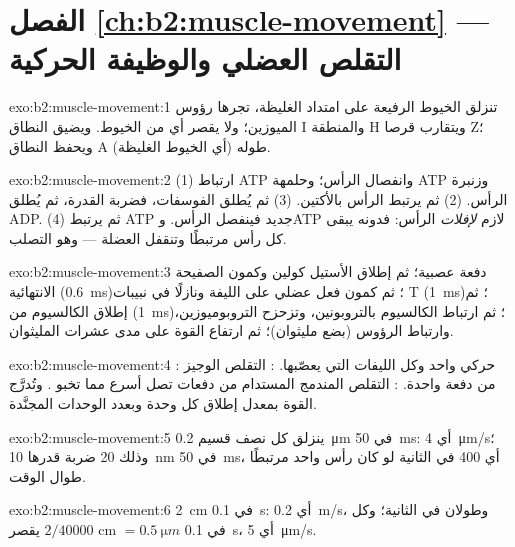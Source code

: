 \section*{الفصل \ref{ch:b2:muscle-movement} --- التقلص العضلي والوظيفة الحركية}

\begin{solution}{exo:b2:muscle-movement:1}
تنزلق الخيوط الرفيعة على امتداد الغليظة، تجرها رؤوس الميوزين؛
ولا يقصر أي من الخيوط. ويضيق النطاق I والمنطقة H ويتقارب
قرصا Z؛ ويحفظ النطاق A (أي الخيوط الغليظة) طوله.
\end{solution}

\begin{solution}{exo:b2:muscle-movement:2}
(1) ارتباط ATP وانفصال الرأس؛ وحلمهة ATP وزنبرة الرأس. (2) ثم يرتبط الرأس
بالأكتين. (3) ثم يُطلق الفوسفات، فضربة القدرة، ثم يُطلق ADP.
(4) ثم يرتبط ATP جديد فينفصل الرأس. وATP لازم
\emph{لإفلات} الرأس: فدونه يبقى كل رأس مرتبطًا وتنقفل
العضلة --- وهو التصلب.
\end{solution}

\begin{solution}{exo:b2:muscle-movement:3}
دفعة عصبية؛ ثم إطلاق الأستيل كولين وكمون الصفيحة الانتهائية
(\qty{0.6}{ms})؛ ثم كمون فعل عضلي على الليفة ونازلًا في
نبيبات T (\qty{1}{ms})؛ ثم إطلاق الكالسيوم من  (\qty{1}{ms})؛ ثم ارتباط الكالسيوم بالتروبونين، وتزحزح التروبوميوزين،
وارتباط الرؤوس (بضع مليثوان)؛ ثم ارتفاع القوة على مدى عشرات
المليثوان.
\end{solution}

\begin{solution}{exo:b2:muscle-movement:4}
:  حركي واحد وكل الليفات التي يعصّبها.
: التقلص الوجيز من دفعة واحدة. : التقلص
المندمج المستدام من دفعات تصل أسرع مما تخبو
. وتُدرَّج القوة بمعدل إطلاق كل وحدة
وبعدد الوحدات المجنَّدة.
\end{solution}

\begin{solution}{exo:b2:muscle-movement:5}
ينزلق كل نصف قسيم \qty{0.2}{\micro m} في \qty{50}{ms}:
أي \qty{4}{\micro m/s}؛ وذلك 20 ضربة قدرها \qty{10}{nm} في
\qty{50}{ms}، أي 400 في الثانية لو كان رأس واحد مرتبطًا طوال الوقت.
\end{solution}

\begin{solution}{exo:b2:muscle-movement:6}
\qty{2}{cm} في \qty{0.1}{s}: أي \qty{0.2}{m/s}، وطولان في الثانية؛ وكل
 يقصر $2/\num{40000}$ cm $= \qty{0.5}{\micro m}$ في
\qty{0.1}{s}، أي \qty{5}{\micro m/s}.
\end{solution}

